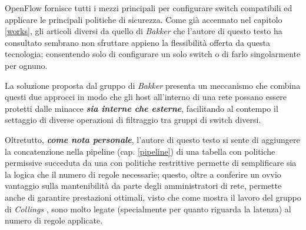 \onehalfspacing
OpenFlow fornisce tutti i mezzi principali per configurare switch compatibili ed applicare le principali politiche di sicurezza. Come già accennato nel capitolo \ref{works}, gli articoli diversi da quello di \textit{Bakker} che l'autore di questo testo ha consultato sembrano non sfruttare appieno la flessibilità offerta da questa tecnologia; consentendo solo di configurare un solo switch o di farlo singolarmente per ognuno.

La soluzione proposta dal gruppo di \textit{Bakker} presenta un meccanismo che combina questi due approcci in modo che gli host all'interno di una rete possano essere protetti dalle minacce \textbf{\textit{sia interne che esterne}}, facilitando al contempo il settaggio di diverse operazioni di filtraggio tra gruppi di switch diversi.

Oltretutto, \textbf{\textit{come nota personale}}, l'autore di questo testo si sente di aggiungere la concatenzione nella pipeline (cap. \ref{pipeline}) di una tabella con politiche permissive succeduta da una con politiche restrittive permette di semplificare sia la logica che il numero di regole necessarie; questo, oltre a conferire un ovvio vantaggio sulla mantenibilità da parte degli amministratori di rete, permette anche di garantire prestazioni ottimali, visto che come mostra il lavoro del gruppo di \textit{Collings} \cite{collings2014openflow}, sono molto legate (specialmente per quanto riguarda la latenza) al numero di regole applicate.
